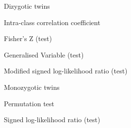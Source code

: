 

\begin{description}[CABR]
\item[DZ]{Dizygotic twins}
\item[ICC]{Intra-class correlation coefficient}
\item[FZ]{Fisher's Z (test)}
\item[GV]{Generalised Variable (test)}
\item[MSLR]{Modified signed log-likelihood ratio (test)}
\item[MZ]{Monozygotic twins}
\item[PT]{Permutation test}
\item[SLR]{Signed log-likelihood ratio (test)}
\end{description}
